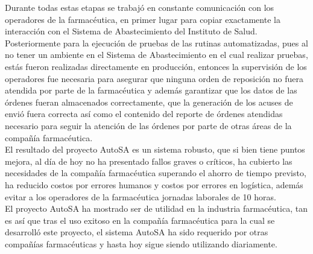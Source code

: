 Durante todas estas etapas se trabajó en constante comunicación con los operadores de la farmacéutica, en primer lugar para copiar exactamente la interacción con el Sistema de Abastecimiento del Instituto de Salud. Posteriormente para la ejecución de pruebas de las rutinas automatizadas, pues al no tener un ambiente en el Sistema de Abastecimiento en el cual realizar pruebas, estás fueron realizadas directamente en producción, entonces la supervisión de los operadores fue necesaria para asegurar que ninguna orden de reposición no fuera atendida por parte de la farmacéutica y además garantizar que los datos de las órdenes fueran almacenados correctamente, que la generación de los acuses de envió fuera correcta así como el contenido del reporte de órdenes atendidas necesario para seguir la atención de las órdenes por parte de otras áreas de la compañía farmacéutica.\\
El resultado del proyecto AutoSA es un sistema robusto, que si bien tiene puntos mejora, al día de hoy no ha presentado fallos graves o críticos, ha cubierto las necesidades de la compañía farmacéutica superando el ahorro de tiempo previsto, ha reducido costos por errores humanos y costos por errores en logística, además evitar a los operadores de la farmacéutica jornadas laborales de 10 horas.\\
El proyecto AutoSA ha mostrado ser de utilidad en la industria farmacéutica, tan es así que tras el uso exitoso en la compañía farmacéutica para la cual se desarrolló este proyecto, el sistema AutoSA ha sido requerido por otras compañías farmacéuticas y hasta hoy sigue siendo  utilizando diariamente.
